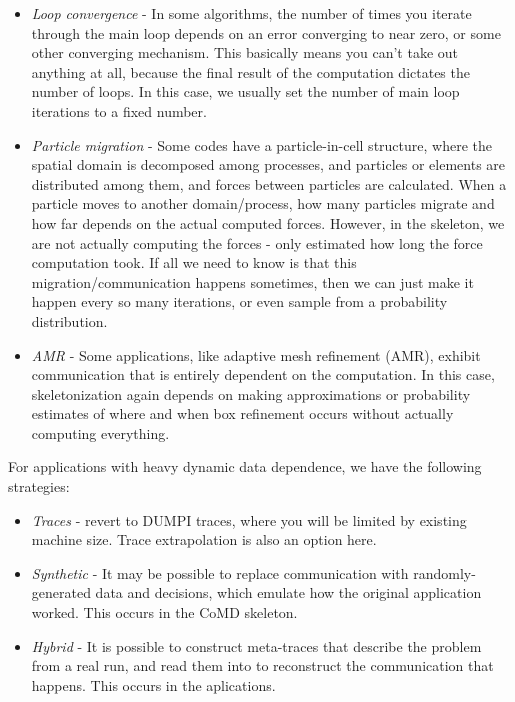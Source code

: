 \begin{itemize}
\item \textit{Loop convergence} - In some algorithms, the number of times you iterate through the main loop depends on an error converging to near zero, or some other converging mechanism.  This basically means you can't take out anything at all, because the final result of the computation dictates the number of loops.  In this case, we usually set the number of main loop iterations to a fixed number.  
\item \textit{Particle migration} - Some codes have a particle-in-cell structure, where the spatial domain is decomposed among processes, and particles or elements are distributed among them, and forces between particles are calculated.  When a particle moves to another domain/process, how many particles migrate and how far depends on the actual computed forces. However, in the skeleton, we are not actually computing the forces - only estimated how long the force computation took.  If all we need to know is that this migration/communication happens sometimes, then we can just make it happen every so many iterations, or even sample from a probability distribution.  
\item \textit{AMR} - Some applications, like adaptive mesh refinement (AMR), exhibit communication that is entirely dependent on the computation.  In this case, skeletonization again depends on making approximations or probability estimates of where and when box refinement occurs without actually computing everything.
\end{itemize}

For applications with heavy dynamic data dependence, we have the following strategies:
\begin{itemize}
\item \textit{Traces}  - revert to DUMPI traces, where you will be limited by existing machine size.  Trace extrapolation is also an option here.
\item \textit{Synthetic} - It may be possible to replace communication with randomly-generated data and decisions, which emulate how the original application worked. This occurs in the CoMD skeleton.
\item \textit{Hybrid} - It is possible to construct meta-traces that describe the problem from a real run, and read them into \sstmacro to reconstruct the communication that happens.  This occurs in the  aplications.
\end{itemize}

